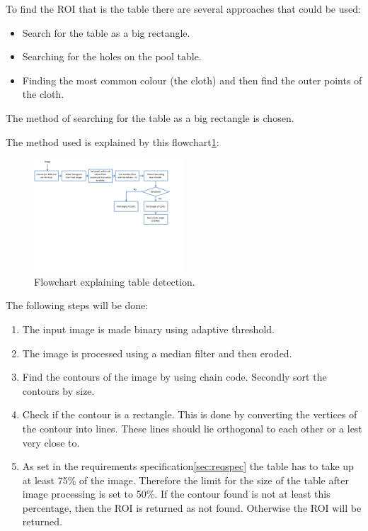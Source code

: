 To find the ROI that is the table there are several approaches that could be used:
\begin{itemize}
	\item Search for the table as a big rectangle.
	\item Searching for the holes on the pool table.
	\item Finding the most common colour (the cloth) and then find the outer points of the cloth.
\end{itemize}

The method of searching for the table as a big rectangle is chosen. 					%

The method used is explained by this flowchart\ref{fig:detecttable_flowchart}:

\begin{figure}[htb]
\begin{center}
\leavevmode
\includegraphics[width=0.5\textwidth]{images/tabledetect_flowchart.pdf}
\end{center}
\caption{Flowchart explaining table detection.}
\label{fig:detecttable_flowchart}
\end{figure}

The following steps will be done:
\begin{enumerate}

\item The input image is made binary using adaptive threshold.

\item The image is processed using a median filter and then eroded.

\item Find the contours of the image by using chain code. Secondly sort the contours by size.

\item Check if the contour is a rectangle. This is done by converting the vertices of the contour into lines. These lines should lie orthogonal to each other or a lest very close to.

\item As set in the requirements specification\ref{sec:reqspec} the table has to take up at least 75\% of the image. Therefore the limit for the size of the table after image processing is set to 50\%. If the contour found is not at least this percentage, then the ROI is returned as not found. Otherwise the ROI will be returned.
\end{enumerate}

